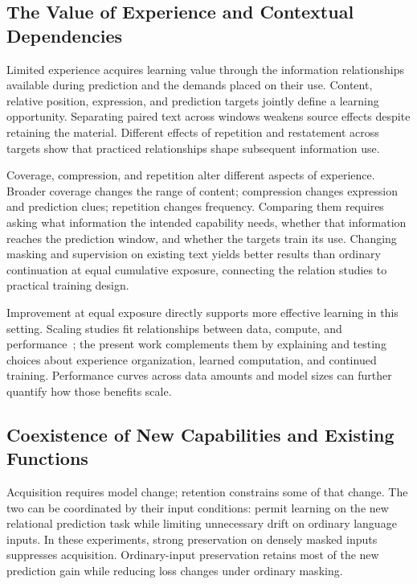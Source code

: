 \label{sec:discussion}

\subsection{The Value of Experience and Contextual Dependencies}

Limited experience acquires learning value through the information relationships available during prediction and the demands placed on their use. Content, relative position, expression, and prediction targets jointly define a learning opportunity. Separating paired text across windows weakens source effects despite retaining the material. Different effects of repetition and restatement across targets show that practiced relationships shape subsequent information use.

Coverage, compression, and repetition alter different aspects of experience. Broader coverage changes the range of content; compression changes expression and prediction clues; repetition changes frequency. Comparing them requires asking what information the intended capability needs, whether that information reaches the prediction window, and whether the targets train its use. Changing masking and supervision on existing text yields better results than ordinary continuation at equal cumulative exposure, connecting the relation studies to practical training design.

Improvement at equal exposure directly supports more effective learning in this setting. Scaling studies fit relationships between data, compute, and performance~\citep{muennighoff2025scaling}; the present work complements them by explaining and testing choices about experience organization, learned computation, and continued training. Performance curves across data amounts and model sizes can further quantify how those benefits scale.

\subsection{Coexistence of New Capabilities and Existing Functions}

Acquisition requires model change; retention constrains some of that change. The two can be coordinated by their input conditions: permit learning on the new relational prediction task while limiting unnecessary drift on ordinary language inputs. In these experiments, strong preservation on densely masked inputs suppresses acquisition. Ordinary-input preservation retains most of the new prediction gain while reducing loss changes under ordinary masking.

